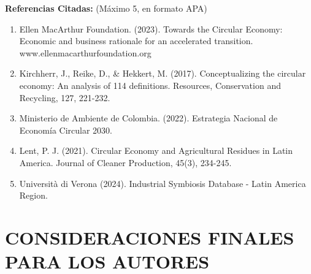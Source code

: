 \documentclass[12pt,a4paper]{article}
\begin{document}
\noindent
\textbf{Referencias Citadas:} (Máximo 5, en formato APA)

\vspace{0.3cm}

\begin{enumerate}
  \item Ellen MacArthur Foundation. (2023). Towards the Circular Economy: Economic and business rationale for an accelerated transition. www.ellenmacarthurfoundation.org

  \item Kirchherr, J., Reike, D., \& Hekkert, M. (2017). Conceptualizing the circular economy: An analysis of 114 definitions. Resources, Conservation and Recycling, 127, 221-232.

  \item Ministerio de Ambiente de Colombia. (2022). Estrategia Nacional de Economía Circular 2030.

  \item Lent, P. J. (2021). Circular Economy and Agricultural Residues in Latin America. Journal of Cleaner Production, 45(3), 234-245.

  \item Università di Verona (2024). Industrial Symbiosis Database - Latin America Region.
\end{enumerate}

\vspace{1cm}

\section*{CONSIDERACIONES FINALES PARA LOS AUTORES}
\end{document}
